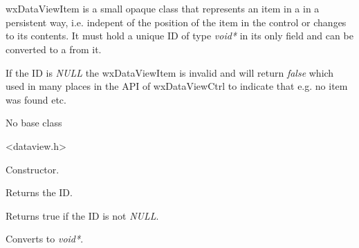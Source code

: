 
\section{}\label{wxdataviewitem}

wxDataViewItem is a small opaque class that represents an
item in a  in a
persistent way, i.e. indepent of the position of the
item in the control or changes to its contents. It must
hold a unique ID of type {\it void*} in its only field
and can be converted to a from it. 

If the ID is {\it NULL} the wxDataViewItem is invalid and 
 will return {\it false}
which used in many places in the API of wxDataViewCtrl
to indicate that e.g. no item was found etc.


No base class


<dataview.h>




\label{wxdataviewitemwxdataviewitem}


Constructor.



\label{wxdataviewitemgetid}


Returns the ID.

\label{wxdataviewitemisok}


Returns true if the ID is not {\it NULL}.

\label{wxdataviewitemvoid*}


Converts to {\it void*}.
